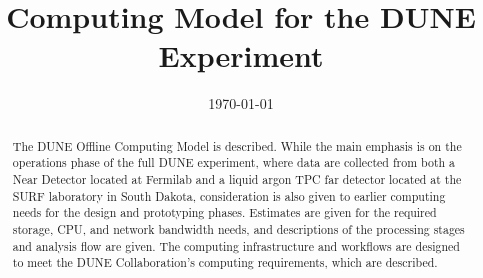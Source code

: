 \documentclass[12pt]{article}
\begin{document}

\title{Computing Model for the DUNE Experiment}

\date{\today}

\maketitle

\begin{abstract}
The DUNE Offline Computing Model is described.  While the main emphasis is
on the operations phase of the full DUNE experiment, where data are collected
from both a Near Detector located at Fermilab and a liquid argon TPC far detector
located at the SURF laboratory in South Dakota, consideration is also given
to earlier computing needs for the design and prototyping phases.  Estimates
are given for the required storage, CPU, and network bandwidth needs, and descriptions
of the processing stages and analysis flow are given.  The computing infrastructure
and workflows are designed to meet the DUNE Collaboration's computing requirements,
which are described.
\end{abstract}







\newpage
%

\newpage
\tableofcontents
\newpage
\listoftables
\newpage
\listoffigures


\newpage


\newpage


\newpage


\newpage


\newpage



\newpage


\newpage


\newpage

\end{document}
